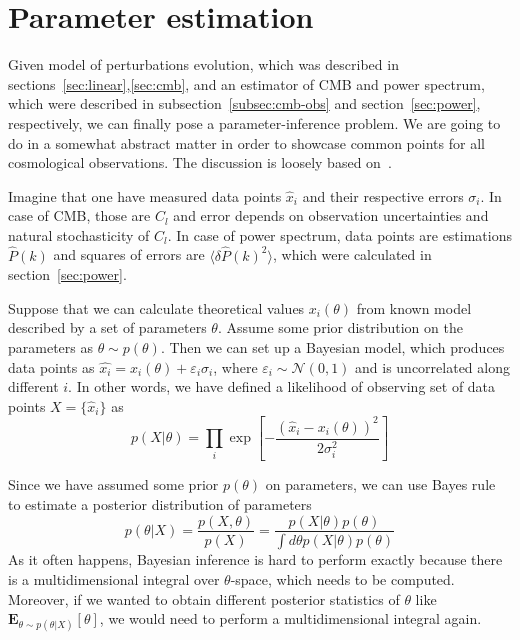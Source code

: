 \documentclass[12pt]{extarticle}
\numberwithin{problem}{section}
\numberwithin{theorem}{section}
\begin{document}
	\section{Parameter estimation}
	Given model of perturbations evolution, which was described in sections~\ref{sec:linear},\ref{sec:cmb}, and an estimator of CMB and power spectrum, which were described in subsection~\ref{subsec:cmb-obs} and section~\ref{sec:power}, respectively, we can finally pose a parameter-inference problem. We are going to do in a somewhat abstract matter in order to showcase common points for all cosmological observations. The discussion is loosely based on~\cite{padilla:2021}.
	
	Imagine that one have measured data points $\hat{x}_i$ and their respective errors $\sigma_i$. In case of CMB, those are $C_l$ and error depends on observation uncertainties and natural stochasticity of $C_l$. In case of power spectrum, data points are estimations $\hat{P}(k)$ and squares of errors are $\langle\delta\hat{P}(k)^2\rangle$, which were calculated in section~\ref{sec:power}. 
	
	Suppose that we can calculate theoretical values $x_i(\theta)$ from known model described by a set of parameters $\theta$. Assume some prior distribution on the parameters as $\theta\sim p(\theta)$. Then we can set up a Bayesian model, which produces data points as $\hat{x_i} = x_i(\theta) + \varepsilon_i\sigma_i$, where $\varepsilon_i\sim\mathcal{N}(0, 1)$ and is uncorrelated along different $i$. In other words, we have defined a likelihood of observing set of data points $X = \{\hat{x}_i\}$ as
	\begin{equation}
		p(X|\theta) = \prod_i \exp\left[-\frac{(\hat{x}_i - x_i(\theta))^2}{2\sigma_i^2}\right]
	\end{equation}

	Since we have assumed some prior $p(\theta)$ on parameters, we can use Bayes rule to estimate a posterior distribution of parameters
	\begin{equation}
		p(\theta|X) = \frac{p(X, \theta)}{p(X)} = \frac{p(X|\theta)p(\theta)}{\int d\theta p(X|\theta)p(\theta)}
	\end{equation}
	As it often happens, Bayesian inference is hard to perform exactly because there is a multidimensional integral over $\theta$-space, which needs to be computed. Moreover, if we wanted to obtain different posterior statistics of $\theta$ like $\mathbf{E}_{\theta\sim p(\theta|X)}[\theta]$, we would need to perform a multidimensional integral again. 
	
\end{document}
